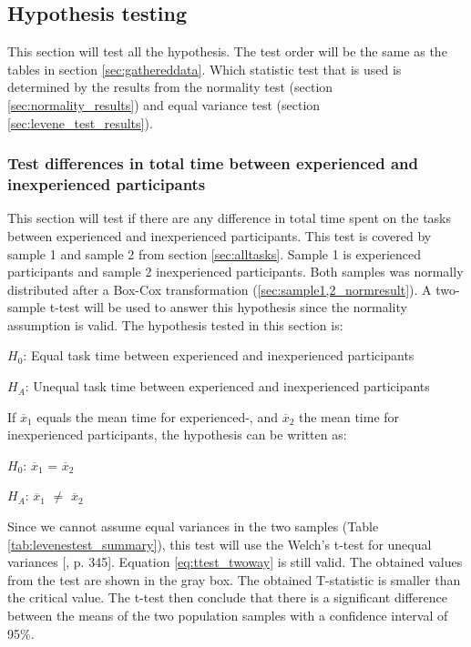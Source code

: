 \vspace{0.5cm}

\subsection{Hypothesis testing}\label{sec:hypothesis_results}
This section will test all the hypothesis. The test order will be the same as the tables in section \ref{sec:gathereddata}. Which statistic test that is used is determined by the results from the normality test (section \ref{sec:normality_results}) and equal variance test (section \ref{sec:levene_test_results}).

\subsubsection[Sample 1, 2]{Test differences in total time between experienced and inexperienced participants}\label{sec:t-test_result} 
This section will test if there are any difference in total time spent on the tasks between experienced and inexperienced participants. This test is covered by sample 1 and sample 2 from section \ref{sec:alltasks}. Sample 1 is experienced participants and sample 2 inexperienced participants. Both samples was normally distributed after a Box-Cox transformation (\ref{sec:sample1,2_normresult}). A two-sample t-test will be used to answer this hypothesis since the normality assumption is valid. The hypothesis tested in this section is: \\[0.3cm]

\centerline{$H_{0}$: Equal task time between experienced and inexperienced participants} 
\centerline{$H_{A}$: Unequal task time between experienced and inexperienced participants}

\vspace{0.3cm}

If $\overline{x}_1$ equals the mean time for experienced-, and $\overline{x}_2$ the mean time for inexperienced participants, the hypothesis can be written as:\\[0.3cm]

\centerline{$H_{0}$: $\overline{x}_1$ = $\overline{x}_2$} 
\centerline{$H_{A}$: $\overline{x}_1$ $\neq$ $\overline{x}_2$}

\vspace{0.3cm}

Since we cannot assume equal variances in the two samples (Table \ref{tab:levenestest_summary}), this test will use the Welch's t-test for unequal variances [\citep{Walpole2012}, p. 345]. Equation \ref{eq:ttest_twoway} is still valid. The obtained values from the test are shown in the gray box. The obtained T-statistic is smaller than the critical value. The t-test then conclude that there is a significant difference between the means of the two population samples with a confidence interval of 95\%.\\[0.2cm]


